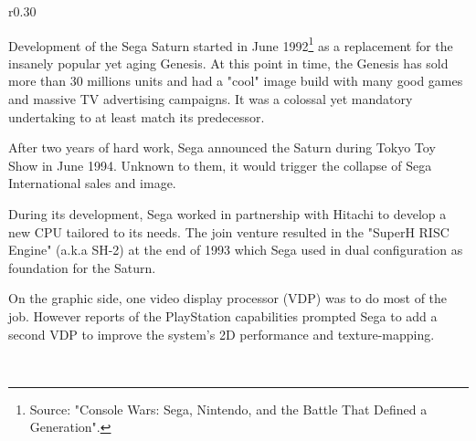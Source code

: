 \begin{wrapfigure}[10]{r}{0.30\textwidth}{
\centering {}}
\end{wrapfigure}
Development of the Sega Saturn started in June 1992\footnote{Source: "Console Wars: Sega, Nintendo, and the Battle That Defined a Generation".} as a replacement for the insanely popular yet aging Genesis. At this point in time, the Genesis has sold more than 30 millions units and had a "cool" image build with many good games and massive TV advertising campaigns. It was a colossal yet mandatory undertaking to at least match its predecessor.\\
\par
After two years of hard work, Sega announced the Saturn during Tokyo Toy Show in June 1994. Unknown to them, it would trigger the collapse of Sega International sales and image.\\
\par
During its development, Sega worked in partnership with Hitachi to develop a new CPU tailored to its needs. The join venture resulted in the "SuperH RISC Engine" (a.k.a SH-2) at the end of 1993 which Sega used in dual configuration as foundation for the Saturn.\\
\par
 On the graphic side, one video display processor (VDP) was to do most of the job. However reports of the PlayStation capabilities prompted Sega to add a second VDP to improve the system's 2D performance and texture-mapping.\\
\par
{}\\


